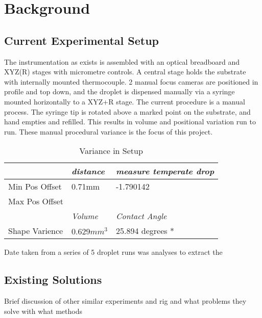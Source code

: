 \chapter{Background}\label{C:back}

\section{Current Experimental Setup}
The instrumentation as exists is assembled with an optical breadboard and XYZ(R) stages with micrometre controls. A central stage holds the substrate with internally mounted thermocouple. 2 manual focus cameras are positioned in profile and top down, and the droplet is dispensed manually via a syringe mounted horizontally to a XYZ+R stage.
The current procedure is a manual process. The syringe tip is rotated above a marked point on the substrate, and hand empties and refilled. This results in volume and positional variation run to run. These manual procedural variance is the focus of this project.

\begin{table}[h]
    \centering
    \begin{tabular}{|l|l|l|}
    \hline
                   & \textit{distance}          & \textit{measure temperate drop} \\ \hline
    Min Pos Offset & 0.71mm                     &           -1.790142
    \\ \hline
    Max Pos Offset &                            &                                 \\ \hline
                   & \textit{Volume}            & \textit{Contact Angle}          \\ \hline
    Shape Varience & $0.629mm^3$ & 25.894 degrees *                \\ \hline
    \end{tabular}
    \caption{Variance in Setup}
    \end{table}

Date taken from a series of 5 droplet runs was analyses to extract the

\section{Existing Solutions}
Brief discussion of other similar experiments and rig and what problems they solve with what methods

